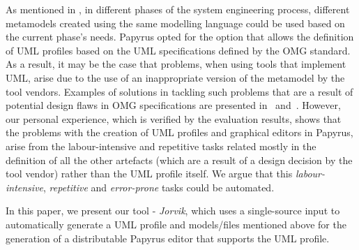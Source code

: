 As mentioned in \cite{kehrer2014versioning}, in different phases of the system engineering process, different metamodels created using the same modelling language could be used based on the current phase's needs. 
Papyrus opted for the option that allows the definition of UML profiles based on the UML specifications defined by the OMG standard. 
As a result, it may be the case that problems, when using tools that implement UML, arise due to the use of an inappropriate version of the metamodel by the tool vendors. 
Examples of solutions in tackling such problems that are a result of potential design flaws in OMG specifications are presented in~\cite{alanen2005subset} and~\cite{kelter2008comparing}. 
However, our personal experience, which is verified by the evaluation results, shows that the problems with the creation of UML profiles and graphical editors in Papyrus, arise from the labour-intensive and repetitive tasks related mostly in the definition of all the other artefacts (which are a result of a design decision by the tool vendor) rather than the UML profile itself. 
We argue that this \textit{labour-intensive}, \textit{repetitive} and \textit{error-prone} tasks could be automated. 

In this paper, we present our tool - \textit{Jorvik}, which uses a single-source input to automatically generate a UML profile and models/files mentioned above for the generation of a distributable Papyrus editor that supports the UML profile. 
